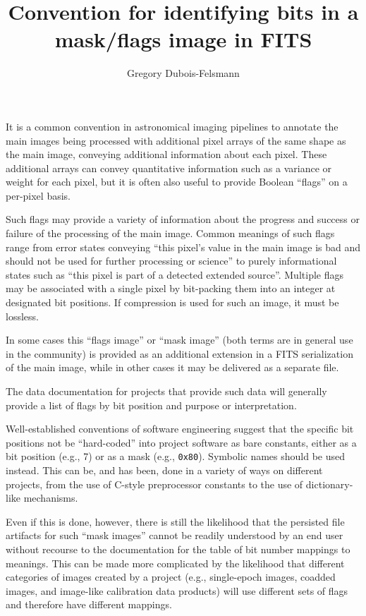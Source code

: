 \documentclass[DM,authoryear,toc]{lsstdoc}
\title{Convention for identifying bits in a mask/flags image in FITS}
\author{%
Gregory Dubois-Felsmann
}
\date{\vcsDate}
\begin{document}
\maketitle


It is a common convention in astronomical imaging pipelines to annotate the
main images being processed with additional pixel arrays of the same shape
as the main image, conveying additional information about each pixel.
These additional arrays can convey quantitative information such as a
variance or weight for each pixel, but it is often also useful to provide
Boolean ``flags'' on a per-pixel basis.

Such flags may provide a variety of information about the progress and
success or failure of the processing of the main image.
Common meanings of such flags range from error states conveying ``this
pixel's value in the main image is bad and should not be used for
further processing or science'' to purely informational states such as
``this pixel is part of a detected extended source''.
Multiple flags may be associated with a single pixel by bit-packing
them into an integer at designated bit positions.
If compression is used for such an image, it must be lossless.

In some cases this ``flags image'' or ``mask image'' (both terms are in
general use in the community) is provided as an additional extension in
a FITS serialization of the main image, while in other cases it may be
delivered as a separate file.

The data documentation for projects that provide such data will generally
provide a list of flags by bit position and purpose or interpretation.

Well-established conventions of software engineering suggest that the
specific bit positions not be ``hard-coded'' into project software as
bare constants, either as a bit position (e.g., 7) or as a mask (e.g.,
\verb|0x80|).
Symbolic names should be used instead.
This can be, and has been, done in a variety of ways on different
projects, from the use of C-style preprocessor constants to the use of
dictionary-like mechanisms.

Even if this is done, however, there is still the likelihood that the
persisted file artifacts for such ``mask images'' cannot be readily
understood by an end user without recourse to the documentation for
the table of bit number mappings to meanings.
This can be made more complicated by the likelihood that different
categories of images created by a project (e.g., single-epoch images,
coadded images, and image-like calibration data products) will use
different sets of flags and therefore have different mappings.
\end{document}
